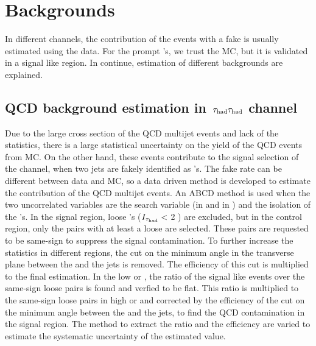 \section{Backgrounds}
\label{sect:bkgLepTau}
In different channels, the contribution of the events with a fake \Tau is usually estimated using the data. For the prompt \Tau's, we trust 
the MC, but it is validated in a signal like region. In continue, estimation of different backgrounds are explained.

\subsection{\texorpdfstring{QCD background estimation in $\,\tau_{\rm had}\tau_{\rm had}$ channel}{QCD background estimation in tau-tau channel}}
Due to the large cross section of the QCD multijet events and lack of the statistics, there is a large statistical uncertainty on the 
yield of the QCD events from MC. On the other hand, these events contribute to the signal selection of the \tauTau channel, when two jets are 
fakely identified as \Tau's. The fake rate can be different between data and MC, so a data driven method is developed to estimate the 
contribution of the QCD multijet events. 
An ABCD method is used when the two uncorrelated variables are the search variable (\mttwo in \binone and \SumMT in \bintwo) and the 
isolation of the \Tau's. In the signal region, loose \Tau's ($I_{\tau_{\rm had}} <$ 2 \GeV ) are excluded, but in the control region, only the pairs with at least a loose \Tau 
are selected. These pairs are requested to be same-sign to suppress the signal contamination. To further increase the statistics 
in different regions, the cut on the minimum angle in the transverse plane between the \MET and the jets is removed. The efficiency of this
cut is multiplied to the final estimation. In the low \mttwo or \SumMT, the ratio of the signal like events over the same-sign loose pairs 
is found and verfied to be flat. 
This ratio is multiplied to the same-sign loose pairs in high \mttwo or \SumMT and corrected by the efficiency of the 
cut on the minimum angle between the \MET and the jets, to find the QCD contamination in the signal region. The method to extract the
ratio and the efficiency are varied to estimate the systematic uncertainty of the estimated value.



